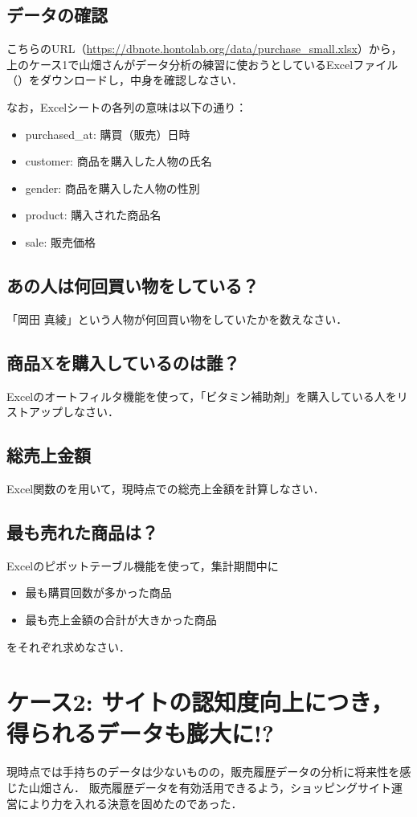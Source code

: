 \subsection*{データの確認}
こちらのURL（\url{https://dbnote.hontolab.org/data/purchase\_small.xlsx}）から，上のケース1で山畑さんがデータ分析の練習に使おうとしているExcelファイル（）をダウンロードし，中身を確認しなさい．

なお，Excelシートの各列の意味は以下の通り：
\begin{itemize}
\item purchased\_at: 購買（販売）日時
\item customer: 商品を購入した人物の氏名
\item gender: 商品を購入した人物の性別
\item product: 購入された商品名
\item sale: 販売価格
\end{itemize}


\subsection*{あの人は何回買い物をしている？}
「岡田 真綾」という人物が何回買い物をしていたかを数えなさい．


\subsection*{商品Xを購入しているのは誰？}
Excelのオートフィルタ機能を使って，「ビタミン補助剤」を購入している人をリストアップしなさい．


\subsection*{総売上金額}
Excel関数のを用いて，現時点での総売上金額を計算しなさい．


\subsection*{最も売れた商品は？}
Excelのピボットテーブル機能を使って，集計期間中に
\begin{itemize}
\item 最も購買回数が多かった商品
\item 最も売上金額の合計が大きかった商品
\end{itemize}
をそれぞれ求めなさい．



\section{ケース2: サイトの認知度向上につき，得られるデータも膨大に!?}
現時点では手持ちのデータは少ないものの，販売履歴データの分析に将来性を感じた山畑さん．
販売履歴データを有効活用できるよう，ショッピングサイト運営により力を入れる決意を固めたのであった．

